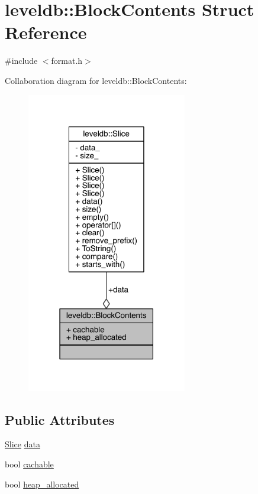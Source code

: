 \hypertarget{structleveldb_1_1_block_contents}{}\section{leveldb\+:\+:Block\+Contents Struct Reference}
\label{structleveldb_1_1_block_contents}


{\ttfamily \#include $<$format.\+h$>$}



Collaboration diagram for leveldb\+:\+:Block\+Contents\+:\nopagebreak
\begin{figure}[H]
\begin{center}
\leavevmode
\includegraphics[width=198pt]{structleveldb_1_1_block_contents__coll__graph}
\end{center}
\end{figure}
\subsection*{Public Attributes}
\begin{DoxyCompactItemize}
\item 
\hyperlink{classleveldb_1_1_slice}{Slice} \hyperlink{structleveldb_1_1_block_contents_aa30fe6388fe0f89d5565f6bae788c28e}{data}
\item 
bool \hyperlink{structleveldb_1_1_block_contents_ad9cbcf81fb1378ce5f9a0db2e8d4b539}{cachable}
\item 
bool \hyperlink{structleveldb_1_1_block_contents_a0d4390fa3d4041ac5a3da51cbb16e315}{heap\+\_\+allocated}
\end{DoxyCompactItemize}


